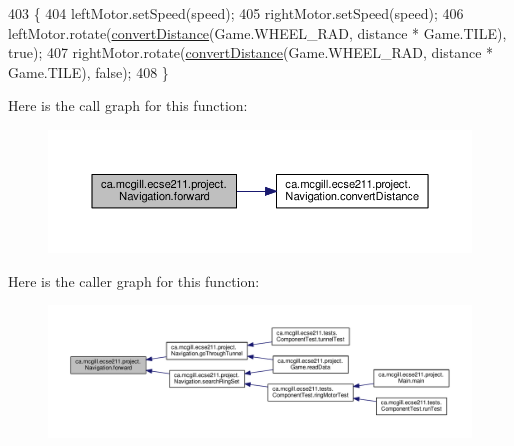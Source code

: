 \begin{DoxyCode}
403                                                   \{
404     leftMotor.setSpeed(speed);
405     rightMotor.setSpeed(speed);
406     leftMotor.rotate(\hyperlink{classca_1_1mcgill_1_1ecse211_1_1project_1_1_navigation_ac9e260bcd619ffa4820d7d0de7ea1c12}{convertDistance}(Game.WHEEL\_RAD, distance * Game.TILE), \textcolor{keyword}{true});
407     rightMotor.rotate(\hyperlink{classca_1_1mcgill_1_1ecse211_1_1project_1_1_navigation_ac9e260bcd619ffa4820d7d0de7ea1c12}{convertDistance}(Game.WHEEL\_RAD, distance * Game.TILE), \textcolor{keyword}{false});
408   \}
\end{DoxyCode}
Here is the call graph for this function\+:
\nopagebreak
\begin{figure}[H]
\begin{center}
\leavevmode
\includegraphics[width=350pt]{classca_1_1mcgill_1_1ecse211_1_1project_1_1_navigation_a7c66610c5b7496ddb35d342ab2cd3f08_cgraph}
\end{center}
\end{figure}
Here is the caller graph for this function\+:
\nopagebreak
\begin{figure}[H]
\begin{center}
\leavevmode
\includegraphics[width=350pt]{classca_1_1mcgill_1_1ecse211_1_1project_1_1_navigation_a7c66610c5b7496ddb35d342ab2cd3f08_icgraph}
\end{center}
\end{figure}
\mbox{\label{classca_1_1mcgill_1_1ecse211_1_1project_1_1_navigation_a4b52e605d3ea2f9bcd9481ae2c69ba39}} 
